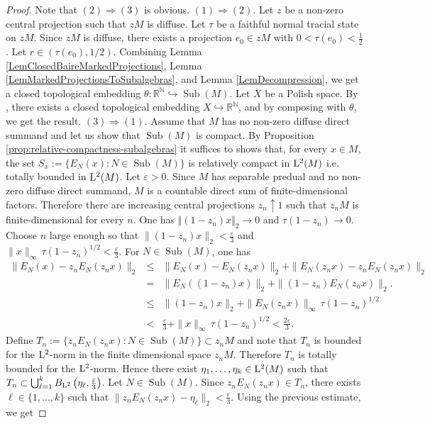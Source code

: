 \documentclass[12pt]{amsart} %
\theoremstyle{plain}
\theoremstyle{definition}
\newcommand{\LL}{{\rm L}}
\DeclareMathOperator{\Sub}{Sub}
\begin{document}
\begin{proof}Note that $(2)\Rightarrow(3)$ is obvious.
\medskip
\noindent$(1)\Rightarrow(2)$. Let $z$ be a non-zero central projection such that $zM$ is diffuse. Let $\tau$ be a faithful normal tracial state on \(zM\). Since \(zM\) is diffuse, there exists a  projection $e_0\in zM$ with $0<\tau(e_0)<\frac12$. Let $r\in(\tau(e_0),1/2)$. Combining Lemma \ref{LemClosedBaireMarkedProjections}, Lemma \ref{LemMarkedProjectionsToSubalgebras}, and Lemma \ref{LemDecompression}, we get a closed topological embedding $\theta:\mathbb R^{\mathbb N}\hookrightarrow \Sub(M)$. Let \(X\) be a Polish space. By \cite[Theorem 4.17]{kechrisClassicaldescriptiveset1995}, there exists a closed topological embedding $X\hookrightarrow \mathbb R^{\mathbb N}$, and by composing with $\theta$, we get the result.
\medskip
\noindent $(3)\Rightarrow(1)$. Assume that \(M\) has no non-zero diffuse direct summand and let us show that $\Sub(M)$ is compact. By Proposition \ref{prop:relative-compactness-subalgebras} it suffices to shows that, for every $x\in M$, the set $S_x:=\{E_N(x):N\in\Sub(M)\}$ is relatively compact in ${\rm L}^2(M)$ i.e. totally bounded in ${\rm L}^2(M)$. Let \(\varepsilon>0\).
Since $M$ has separable predual and no non-zero diffuse direct summand, $M$ is a countable direct sum of finite-dimensional factors. Therefore there are increasing central projections $z_n\uparrow1$ such that $z_nM$ is finite-dimensional for every $n$. %
One has $\Vert(1-z_n)x\Vert_2\to0$ and $\tau(1-z_n)\to0$. Choose \(n\) large enough so that $\|(1-z_n)x\|_2<\frac{\varepsilon}{3}$ and $\|x\|_\infty\,\tau(1-z_n)^{1/2}<\frac{\varepsilon}{3}$. For \(N\in\Sub(M)\), one has
\begin{eqnarray*}
        \|E_N(x)-z_nE_N(z_nx)\|_2
        &\leq&
        \|E_N(x)-E_N(z_nx)\|_2
        +
        \|E_N(z_nx)-z_nE_N(z_nx)\|_2  \\
        &=&
        \|E_N((1-z_n)x)\|_2
        +
        \|(1-z_n)E_N(z_nx)\|_2.\\
        &\leq & \|(1-z_n)x\|_2+\|E_N(z_nx)\|_\infty\,\tau(1-z_n)^{1/2}\\
        &<& \frac{\varepsilon}{3}+\|x\|_\infty\,\tau(1-z_n)^{1/2}<\frac{2\varepsilon}{3}.
\end{eqnarray*}
Define $T_n:=\{z_nE_N(z_nx):N\in\Sub(M)\}\subset z_nM$ and note that $T_n$ is bounded for the \({\rm L}^2\)-norm in the finite dimensional space $z_nM$. Therefore \(T_n\) is totally bounded for the \({\rm L}^2\)-norm. Hence there exist $ \eta_1,\dots,\eta_k\in {\rm L}^2(M)$ such that $T_n\subset \bigcup_{\ell=1}^k B_{\LL^2}\left(\eta_\ell,\frac{\varepsilon}{3}\right)$. Let \(N\in\Sub(M)\). Since \(z_nE_N(z_nx)\in T_n\), there exists \(\ell\in\{1,\dots,k\}\) such that $\|z_nE_N(z_nx)-\eta_\ell\|_2<\frac{\varepsilon}{3}$. Using the previous estimate, we get

\end{proof}
\end{document}
